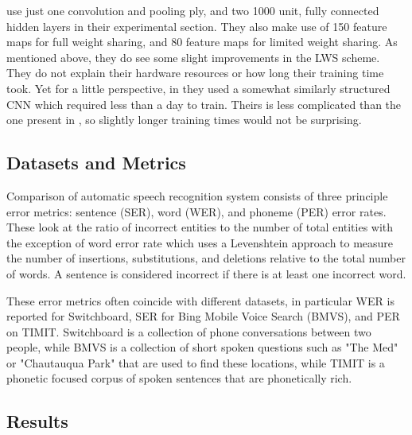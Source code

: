 \documentclass[letterpaper]{article}
\begin{document}
\cite{DBLP:journals/taslp/Abdel-HamidMJDPY14} use just one convolution and pooling ply, and two 1000 unit, fully connected hidden layers in their experimental section. They also make use of 150 feature maps for full weight sharing, and 80 feature maps for limited weight sharing. As mentioned above, they do see some slight improvements in the LWS scheme. They do not explain their hardware resources or how long their training time took. Yet for a little perspective, in \cite{hau2011exploring} they used a somewhat similarly structured CNN which required less than a day to train. Theirs is less complicated than the one present in \cite{DBLP:journals/taslp/Abdel-HamidMJDPY14}, so slightly longer training times would not be surprising.

\subsection*{Datasets and Metrics}

Comparison of automatic speech recognition system consists of three principle error metrics: sentence (SER), word (WER), and phoneme (PER) error rates. These look at the ratio of incorrect entities to the number of total entities with the exception of word error rate which uses a Levenshtein approach to measure the number of insertions, substitutions, and deletions relative to the total number of words. A sentence is considered incorrect if there is at least one incorrect word. 

These error metrics often coincide with different datasets, in particular WER is reported for Switchboard, SER for Bing Mobile Voice Search (BMVS), and PER on TIMIT. Switchboard is a collection of phone conversations between two people, while BMVS is a collection of short spoken questions such as "The Med" or "Chautauqua Park" that are used to find these locations, while TIMIT is a phonetic focused corpus of spoken sentences that are phonetically rich.

\subsection*{Results}
\end{document}
